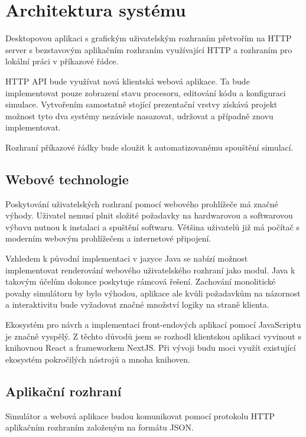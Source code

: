 \section{Architektura systému}

Desktopovou aplikaci s grafickým uživatelským rozhraním přetvořím na HTTP server s bezstavovým aplikačním rozhraním využívající HTTP a rozhraním pro lokální práci v příkazové řádce.

HTTP API bude využívat nová klientská webová aplikace.
Ta bude implementovat pouze zobrazení stavu procesoru, editování kódu a konfiguraci simulace.
Vytvořením samostatně stojící prezentační vrstvy získává projekt možnost tyto dva systémy nezávisle nasazovat, udržovat a případně znovu implementovat.

Rozhraní příkazové řádky bude sloužit k automatizovanému spouštění simulací.

\subsection{Webové technologie}

Poskytování uživatelských rozhraní pomocí webového prohlížeče má značné výhody.
Uživatel nemusí plnit složité požadavky na hardwarovou a softwarovou výbavu nutnou k instalaci a spuštění softwaru.
Většina uživatelů již má počítač s moderním webovým prohlížečem a internetové připojení.

Vzhledem k původní implementaci v jazyce Java se nabízí možnost implementovat renderování webového uživatelského rozhraní jako modul.
Java k takovým účelům dokonce poskytuje rámcová řešení.
Zachování monolitické povahy simulátoru by bylo výhodou, aplikace ale kvůli požadavkům na názornost a interaktivitu bude vyžadovat značné množství logiky na straně klienta.

Ekosystém pro návrh a implementaci front-endových aplikací pomocí JavaScriptu je značně vyspělý.
Z těchto důvodů jsem se rozhodl klientskou aplikaci vyvinout s knihovnou React a frameworkem NextJS.
Při vývoji budu moci využít existující ekosystém pokročilých nástrojů a mnoha knihoven.

\subsection{Aplikační rozhraní}

Simulátor a webová aplikace budou komunikovat pomocí protokolu HTTP aplikačním rozhraním založeným na formátu JSON. 

